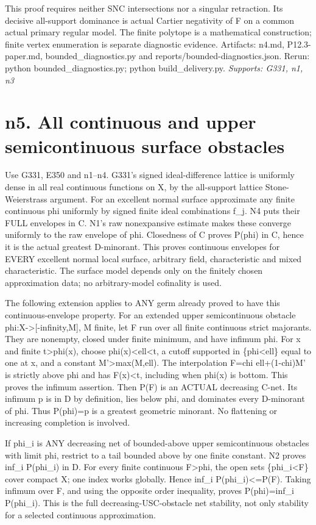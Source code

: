 \documentclass[11pt]{article}
\begin{document}
This proof requires neither SNC intersections nor a singular retraction. Its decisive all-support dominance is actual Cartier negativity of F on a common actual primary regular model. The finite polytope is a mathematical construction; finite vertex enumeration is separate diagnostic evidence. Artifacts: n4.md, P12.3-paper.md, bounded\_diagnostics.py and reports/bounded-diagnostics.json. Rerun: python bounded\_diagnostics.py; python build\_delivery.py.
\textit{Supports: G331, n1, n3}

\section{n5. All continuous and upper semicontinuous surface obstacles}

Use G331, E350 and n1--n4. G331's signed ideal-difference lattice is uniformly dense in all real continuous functions on X, by the all-support lattice Stone-Weierstrass argument. For an excellent normal surface approximate any finite continuous phi uniformly by signed finite ideal combinations f\_j. N4 puts their FULL envelopes in C. N1's raw nonexpansive estimate makes these converge uniformly to the raw envelope of phi. Closedness of C proves P(phi) in C, hence it is the actual greatest D-minorant. This proves continuous envelopes for EVERY excellent normal local surface, arbitrary field, characteristic and mixed characteristic. The surface model depends only on the finitely chosen approximation data; no arbitrary-model cofinality is used.

The following extension applies to ANY germ already proved to have this continuous-envelope property. For an extended upper semicontinuous obstacle phi:X->[-infinity,M], M finite, let F run over all finite continuous strict majorants. They are nonempty, closed under finite minimum, and have infimum phi. For x and finite t>phi(x), choose phi(x)<ell<t, a cutoff supported in \{phi<ell\} equal to one at x, and a constant M'>max(M,ell). The interpolation F=chi ell+(1-chi)M' is strictly above phi and has F(x)<t, including when phi(x) is bottom. This proves the infimum assertion. Then P(F) is an ACTUAL decreasing C-net. Its infimum p is in D by definition, lies below phi, and dominates every D-minorant of phi. Thus P(phi)=p is a greatest geometric minorant. No flattening or increasing completion is involved.

If phi\_i is ANY decreasing net of bounded-above upper semicontinuous obstacles with limit phi, restrict to a tail bounded above by one finite constant. N2 proves inf\_i P(phi\_i) in D. For every finite continuous F>phi, the open sets \{phi\_i<F\} cover compact X; one index works globally. Hence inf\_i P(phi\_i)<=P(F). Taking infimum over F, and using the opposite order inequality, proves P(phi)=inf\_i P(phi\_i). This is the full decreasing-USC-obstacle net stability, not only stability for a selected continuous approximation.
\end{document}
